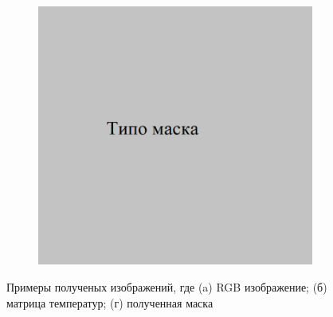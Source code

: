 \documentclass[t]{beamer}
\begin{document}
\begin{frame}
\begin{figure}[ht!]
\begin{subfigure}{.30\textwidth}
				\caption{}
			\end{subfigure}
			\begin{subfigure}{.30\textwidth}
				\centering
				\includegraphics[width = \textwidth]{image/mask}
				\caption{}
			\end{subfigure}
			\centering
			\caption{Примеры полученых изображений, где (a) RGB изображение; (б) матрица температур; (г) полученная маска}
			\label{fig:Examples}
		\end{figure}
	\end{frame}
\end{document}
